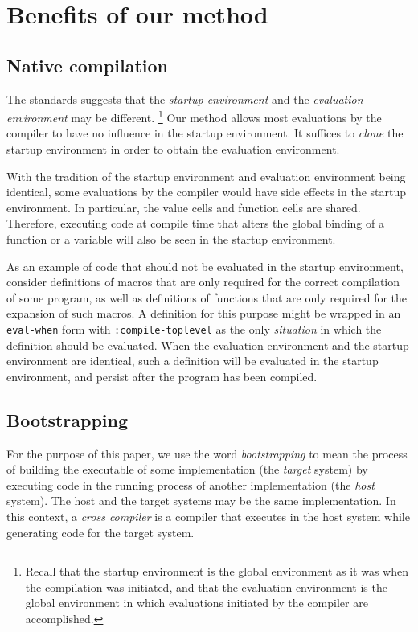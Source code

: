 \section{Benefits of our method}
 
\subsection{Native compilation}

The \commonlisp{} standards suggests that the \emph{startup
  environment} and the \emph{evaluation environment} may be
different.%
\footnote{Recall that the startup environment is the global
environment as it was when the compilation was initiated, and that the
evaluation environment is the global environment in which evaluations
initiated by the compiler are accomplished.}
Our method allows most evaluations by the compiler to have no
influence in the startup environment.  It suffices to \emph{clone} the
startup environment in order to obtain the evaluation environment.

With the tradition of the startup environment and evaluation
environment being identical, some evaluations by the compiler would
have side effects in the startup environment.  In particular, the
value cells and function cells are shared.  Therefore, executing code
at compile time that alters the global binding of a function or a
variable will also be seen in the startup environment.

As an example of code that should not be evaluated in the startup
environment, consider definitions of macros that are only required for
the correct compilation of some program, as well as definitions of
functions that are only required for the expansion of such macros.  A
definition for this purpose might be wrapped in an \texttt{eval-when}
form with \texttt{:compile-toplevel} as the only \emph{situation} in
which the definition should be evaluated.  When the evaluation
environment and the startup environment are identical, such a
definition will be evaluated in the startup environment, and persist
after the program has been compiled.

\subsection{Bootstrapping}

For the purpose of this paper, we use the word \emph{bootstrapping} to
mean the process of building the executable of some implementation
(the \emph{target} system) by executing code in the running process of
another implementation (the \emph{host} system).  The host and the
target systems may be the same implementation.  In this context, a
\emph{cross compiler} is a compiler that executes in the host system
while generating code for the target system.

